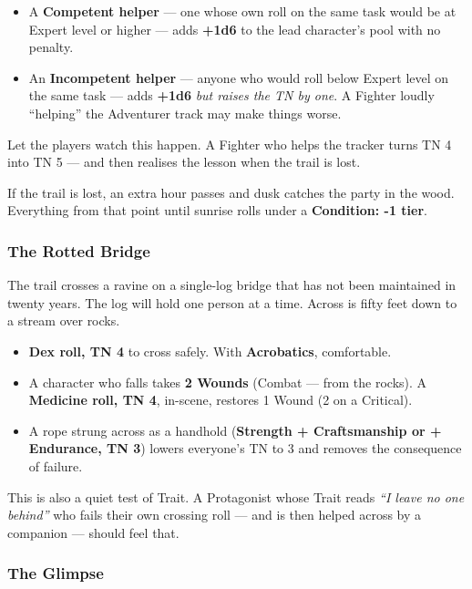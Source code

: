 \documentclass[10pt,a4paper]{article}
\newcommand{\tightlist}{\setlength{\itemsep}{0pt}\setlength{\parskip}{0pt}}
\begin{document}
\begin{itemize}
\tightlist
\item
  A \textbf{Competent helper} --- one whose own roll on the same task would be at Expert level or higher --- adds \textbf{+1d6} to the lead character’s pool with no penalty.
\item
  An \textbf{Incompetent helper} --- anyone who would roll below Expert level on the same task --- adds \textbf{+1d6} \emph{but raises the TN by one}. A Fighter loudly “helping” the Adventurer track may make things worse.
\end{itemize}

Let the players watch this happen. A Fighter who helps the tracker turns TN 4 into TN 5 --- and then realises the lesson when the trail is lost.

If the trail is lost, an extra hour passes and dusk catches the party in the wood. Everything from that point until sunrise rolls under a \textbf{Condition: -1 tier}.

\subsubsection{The Rotted Bridge}\label{the-rotted-bridge}

The trail crosses a ravine on a single-log bridge that has not been maintained in twenty years. The log will hold one person at a time. Across is fifty feet down to a stream over rocks.

\begin{itemize}
\tightlist
\item
  \textbf{Dex roll, TN 4} to cross safely. With \textbf{Acrobatics}, comfortable.
\item
  A character who falls takes \textbf{2 Wounds} (Combat --- from the rocks). A \textbf{Medicine roll, TN 4}, in-scene, restores 1 Wound (2 on a Critical).
\item
  A rope strung across as a handhold (\textbf{Strength + Craftsmanship or + Endurance, TN 3}) lowers everyone’s TN to 3 and removes the consequence of failure.
\end{itemize}

This is also a quiet test of Trait. A Protagonist whose Trait reads \emph{“I leave no one behind”} who fails their own crossing roll --- and is then helped across by a companion --- should feel that.

\subsubsection{The Glimpse}\label{the-glimpse}
\end{document}
